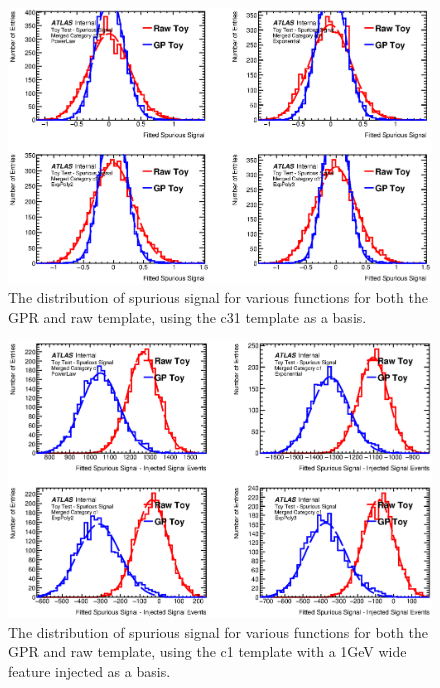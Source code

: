 \begin{figure} 
\begin{center}
  \includegraphics[width=\textwidth]{figures/background/gpr/validation/ToyTest_FitSigVals_Merged_Category_c31NoSig.eps}  
 \caption{The distribution of spurious signal for various functions for both the GPR and raw template, using the c31 template as a basis.}
  \label{fig:c31NoSig}
\end{center}
\end{figure}

\begin{figure} 
\begin{center}
    \includegraphics[width=\textwidth]{figures/background/gpr/validation/ToyTest_FitSigVals_Merged_Category_c1Sig.eps}
     \caption{The distribution of spurious signal for various functions for both the GPR and raw template, using the c1 template with a 1GeV wide feature injected as a basis.}
\label{fig:c1Sig}
\end{center}
\end{figure}

